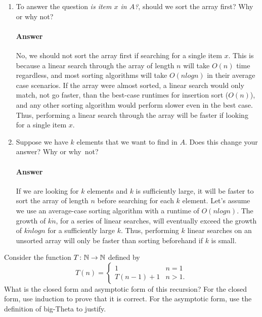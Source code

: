 \documentclass{article}
\begin{document}
\begin{enumerate}
    \item To answer the question \emph{is item $x$ in $A$?}, should we
        sort the array first?  Why or why not?

        \paragraph{Answer}{No, we should not sort the array first if searching for a single item $x$. This is because a linear search through the array of length $n$ will take $O(n)$ time regardless, and most sorting algorithms will take $O(nlogn)$ in their average case scenarios. If the array were almost sorted, a linear search would only match, not go faster, than the best-case runtimes for insertion sort ($O(n)$), and any other sorting algorithm would perform slower even in the best case. Thus, performing a linear search through the array will be faster if looking for a single item $x$.}

    \item Suppose we have $k$ elements that we want to find in $A$. Does this
        change your answer? Why or why~not?

        \paragraph{Answer}{If we are looking for $k$ elements and $k$ is sufficiently large, it will be faster to sort the array of length $n$ before searching for each $k$ element. Let's assume we use an average-case sorting algorithm with a runtime of $O(nlogn)$. The growth of $k \dot n$, for a series of linear searches, will eventually exceed the growth of $k \dot nlogn$ for a sufficiently large $k$. Thus, performing $k$ linear searches on an unsorted array will only be faster than sorting beforehand if $k$ is small.}

\end{enumerate}

\collab{\todo{}}
Consider the function $T \colon {\mathbb N} \to {\mathbb N}$ defined by
$$T(n) = \begin{cases}
            1        & n=1\\
            T(n-1)+1 & n>1.
         \end{cases}
$$
What is the closed form and asymptotic form of this recursion?  For the
closed form, use induction to prove that it is correct.  For the asymptotic
form, use the definition of big-Theta to justify.
\end{document}
